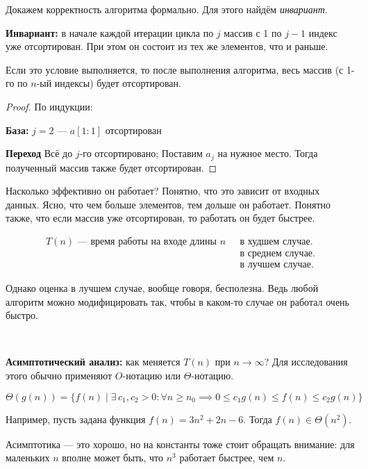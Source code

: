 Докажем корректность алгоритма формально. Для этого найдём \emph{инвариант}.

\textbf{Инвариант:} в начале каждой итерации цикла по $j$ массив с 1 по $j-1$ индекс уже отсортирован. При этом он состоит из тех же элементов, что и раньше.

Если это условие выполняется, то после выполнения алгоритма, весь массив (с 1-го по $n$-ый индексы) будет отсортирован.

\begin{proof} По индукции:

\textbf{База:} $j=2$ --- $a[1:1]$ отсортирован

\textbf{Переход} Всё до $j$-го отсортировано; Поставим $a_j$ на нужное место. Тогда полученный массив также будет отсортирован.
\end{proof}
Насколько эффективно он работает?  Понятно, что это зависит от входных данных. Ясно, что чем больше элементов, тем дольше он работает.
Понятно также, что если массив уже отсортирован, то работать он будет быстрее.

\begin{align}
    \text{$T(n)$ --- время работы на входе длины $n$ }&\text{в худшем случае.}\\
    &\text{в среднем случае.} \\
    &\text{в лучшем случае.}
\end{align}

Однако оценка в лучшем случае, вообще говоря, бесполезна. Ведь любой алгоритм можно модифицировать так, чтобы в каком-то случае он работал очень быстро.

\

\textbf{Асимптотический анализ:} как меняется $T(n)$ при $n\to \infty$? Для исследования этого обычно применяют $O$-нотацию или $\Theta$-нотацию.

\[\Theta(g(n)) = \{f(n)\mid\exists\,c_1, c_2 > 0: \forall n\geqslant n_0 \implies 0 \leqslant c_1g(n) \leqslant f(n) \leqslant c_2g(n)\}\]

Например, пусть задана функция $f(n) = 3n^2 + 2n - 6$. Тогда $f(n) \in \Theta(n^2)$.

Асимптотика --- это хорошо, но на константы тоже стоит обращать внимание: для маленьких $n$ вполне может быть, что $n^3$ работает быстрее, чем $n$.

\begin{center}
\end{center}

